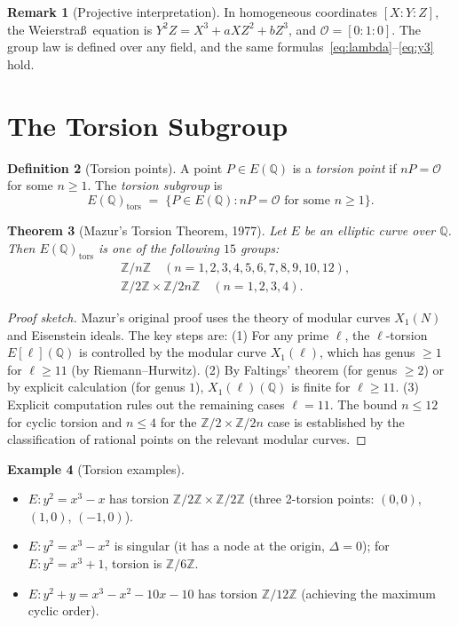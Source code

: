 \documentclass[12pt,a4paper]{amsart}
\newtheorem{theorem}{Theorem}[section]
\theoremstyle{definition}
\newtheorem{definition}[theorem]{Definition}
\newtheorem{remark}[theorem]{Remark}
\newtheorem{example}[theorem]{Example}
\newcommand{\Z}{\mathbb{Z}}
\newcommand{\Q}{\mathbb{Q}}
\begin{document}
\begin{remark}[Projective interpretation]
In homogeneous coordinates $[X:Y:Z]$, the Weierstra\ss\ equation is
$Y^2 Z = X^3 + aXZ^2 + bZ^3$, and $\mathcal{O} = [0:1:0]$.
The group law is defined over any field, and the same formulas~\eqref{eq:lambda}--\eqref{eq:y3}
hold.
\end{remark}

\section{The Torsion Subgroup}

\begin{definition}[Torsion points]
\label{def:torsion}
A point $P \in E(\Q)$ is a \emph{torsion point} if $nP = \mathcal{O}$
for some $n \ge 1$.  The \emph{torsion subgroup} is
\[
  E(\Q)_{\mathrm{tors}} \;=\; \{P \in E(\Q) : nP = \mathcal{O}
  \text{ for some } n \ge 1\}.
\]
\end{definition}

\begin{theorem}[Mazur's Torsion Theorem, 1977]
\label{thm:mazur}
Let $E$ be an elliptic curve over $\Q$.  Then $E(\Q)_{\mathrm{tors}}$
is one of the following $15$ groups:
\begin{align*}
  &\Z/n\Z \quad (n = 1, 2, 3, 4, 5, 6, 7, 8, 9, 10, 12), \\
  &\Z/2\Z \times \Z/2n\Z \quad (n = 1, 2, 3, 4).
\end{align*}
\end{theorem}

\begin{proof}[Proof sketch]
Mazur's original proof \cite{Mazur1977} uses the theory of modular curves
$X_1(N)$ and Eisenstein ideals.
The key steps are:
(1) For any prime $\ell$, the $\ell$-torsion $E[\ell](\Q)$ is controlled
by the modular curve $X_1(\ell)$, which has genus $\ge 1$ for $\ell \ge 11$
(by Riemann--Hurwitz).
(2) By Faltings' theorem (for genus $\ge 2$) or by explicit calculation
(for genus $1$), $X_1(\ell)(\Q)$ is finite for $\ell \ge 11$.
(3) Explicit computation rules out the remaining cases $\ell = 11$.
The bound $n \le 12$ for cyclic torsion and $n \le 4$ for the
$\Z/2 \times \Z/2n$ case is established by the classification of
rational points on the relevant modular curves.
\end{proof}

\begin{example}[Torsion examples]
\begin{itemize}
  \item $E: y^2 = x^3 - x$ has torsion $\Z/2\Z \times \Z/2\Z$
    (three 2-torsion points: $(0,0)$, $(1,0)$, $(-1,0)$).
  \item $E: y^2 = x^3 - x^2$ is singular (it has a node at the
    origin, $\Delta = 0$); for $E: y^2 = x^3 + 1$, torsion is $\Z/6\Z$.
  \item $E: y^2 + y = x^3 - x^2 - 10x - 10$ has torsion $\Z/12\Z$
    (achieving the maximum cyclic order).
\end{itemize}
\end{example}
\end{document}
